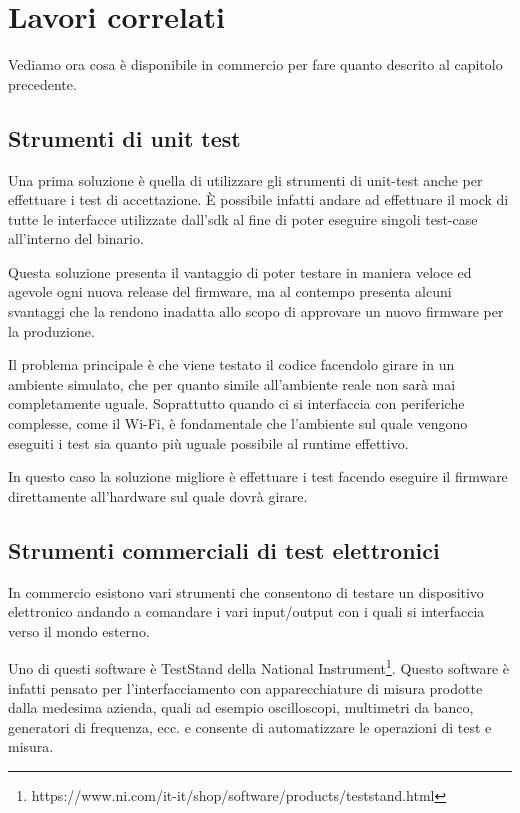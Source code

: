 \documentclass[12pt,a4paper,twoside,titlepage]{book}
\begin{document}
\chapter{Lavori correlati}

Vediamo ora cosa è disponibile in commercio per fare quanto descrito al capitolo precedente.

\section{Strumenti di unit test}

Una prima soluzione è quella di utilizzare gli strumenti di
unit-test anche per effettuare i test di accettazione.
È possibile infatti andare ad effettuare il mock di tutte le interfacce utilizzate dall'\acrshort{sdk}
al fine di poter eseguire singoli test-case all'interno del binario.

Questa soluzione presenta il vantaggio di poter testare in maniera veloce ed agevole
ogni nuova release del \gls{firmware}, ma al contempo presenta alcuni svantaggi che la rendono
inadatta allo scopo di approvare un nuovo \gls{firmware} per la produzione.

Il problema principale è che viene testato il codice facendolo girare in un ambiente simulato,
che per quanto simile all'ambiente reale non sarà mai completamente uguale. Soprattutto
quando ci si interfaccia con periferiche complesse, come il Wi-Fi, è fondamentale che
l'ambiente sul quale vengono eseguiti i test sia quanto più uguale possibile al runtime effettivo.

In questo caso la soluzione migliore è effettuare i test facendo eseguire il \gls{firmware} direttamente
all'hardware sul quale dovrà girare.

\section{Strumenti commerciali di test elettronici}

In commercio esistono vari strumenti che consentono di testare un dispositivo elettronico andando
a comandare i vari input/output con i quali si interfaccia verso il mondo esterno.

Uno di questi software è TestStand della National Instrument\footnote{https://www.ni.com/it-it/shop/software/products/teststand.html}.
Questo software è infatti pensato per l'interfacciamento con apparecchiature di misura prodotte
dalla medesima azienda, quali ad esempio oscilloscopi, multimetri da banco, generatori di frequenza, ecc.
e consente di automatizzare le operazioni di test e misura.
\end{document}
